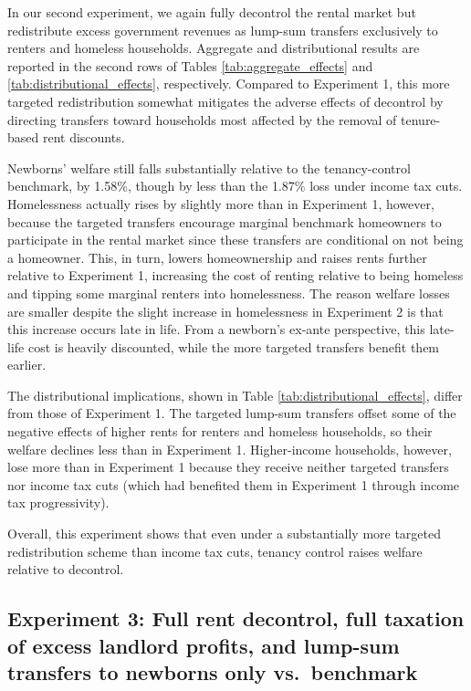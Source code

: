 \documentclass[parskip=full]{article}
\begin{document}
In our second experiment, we again fully decontrol the rental market but redistribute excess government revenues as lump-sum transfers exclusively to renters and homeless households. Aggregate and distributional results are reported in the second rows of Tables \ref{tab:aggregate_effects} and \ref{tab:distributional_effects}, respectively. Compared to Experiment 1, this more targeted redistribution somewhat mitigates the adverse effects of decontrol by directing transfers toward households most affected by the removal of tenure-based rent discounts. 

Newborns' welfare still falls substantially relative to the tenancy-control benchmark, by 1.58\%, though by less than the 1.87\% loss under income tax cuts. Homelessness actually rises by slightly more than in Experiment 1, however, because the targeted transfers encourage marginal benchmark homeowners to participate in the rental market since these transfers are conditional on not being a homeowner. This, in turn, lowers homeownership and raises rents further relative to Experiment 1, increasing the cost of renting relative to being homeless and tipping some marginal renters into homelessness. The reason welfare losses are smaller despite the slight increase in homelessness in Experiment 2 is that this increase occurs late in life. From a newborn's ex-ante perspective, this late-life cost is heavily discounted, while the more targeted transfers benefit them earlier.

The distributional implications, shown in Table \ref{tab:distributional_effects}, differ from those of Experiment 1. The targeted lump-sum transfers offset some of the negative effects of higher rents for renters and homeless households, so their welfare declines less than in Experiment 1. Higher-income households, however, lose more than in Experiment 1 because they receive neither targeted transfers nor income tax cuts (which had benefited them in Experiment 1 through income tax progressivity).

Overall, this experiment shows that even under a substantially more targeted redistribution scheme than income tax cuts, tenancy control raises welfare relative to decontrol.

\subsection{Experiment 3: Full rent decontrol, full taxation of excess landlord profits, and lump-sum transfers to newborns only vs.\ benchmark}\label{sec:exp_3}
\end{document}
